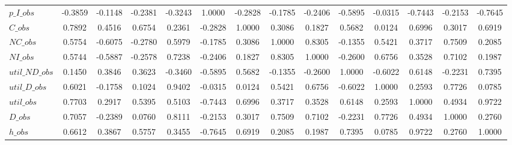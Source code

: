 \begin{center}
\begin{longtable}{lccccccccccccc}
$p\_I\_obs      $	 & 	          -0.3859	 & 	          -0.1148	 & 	          -0.2381	 & 	          -0.3243	 & 	           1.0000	 & 	          -0.2828	 & 	          -0.1785	 & 	          -0.2406	 & 	          -0.5895	 & 	          -0.0315	 & 	          -0.7443	 & 	          -0.2153	 & 	          -0.7645 \\ 
$C\_obs         $	 & 	           0.7892	 & 	           0.4516	 & 	           0.6754	 & 	           0.2361	 & 	          -0.2828	 & 	           1.0000	 & 	           0.3086	 & 	           0.1827	 & 	           0.5682	 & 	           0.0124	 & 	           0.6996	 & 	           0.3017	 & 	           0.6919 \\ 
$NC\_obs        $	 & 	           0.5754	 & 	          -0.6075	 & 	          -0.2780	 & 	           0.5979	 & 	          -0.1785	 & 	           0.3086	 & 	           1.0000	 & 	           0.8305	 & 	          -0.1355	 & 	           0.5421	 & 	           0.3717	 & 	           0.7509	 & 	           0.2085 \\ 
$NI\_obs        $	 & 	           0.5744	 & 	          -0.5887	 & 	          -0.2578	 & 	           0.7238	 & 	          -0.2406	 & 	           0.1827	 & 	           0.8305	 & 	           1.0000	 & 	          -0.2600	 & 	           0.6756	 & 	           0.3528	 & 	           0.7102	 & 	           0.1987 \\ 
$util\_ND\_obs  $	 & 	           0.1450	 & 	           0.3846	 & 	           0.3623	 & 	          -0.3460	 & 	          -0.5895	 & 	           0.5682	 & 	          -0.1355	 & 	          -0.2600	 & 	           1.0000	 & 	          -0.6022	 & 	           0.6148	 & 	          -0.2231	 & 	           0.7395 \\ 
$util\_D\_obs   $	 & 	           0.6021	 & 	          -0.1758	 & 	           0.1024	 & 	           0.9402	 & 	          -0.0315	 & 	           0.0124	 & 	           0.5421	 & 	           0.6756	 & 	          -0.6022	 & 	           1.0000	 & 	           0.2593	 & 	           0.7726	 & 	           0.0785 \\ 
$util\_obs      $	 & 	           0.7703	 & 	           0.2917	 & 	           0.5395	 & 	           0.5103	 & 	          -0.7443	 & 	           0.6996	 & 	           0.3717	 & 	           0.3528	 & 	           0.6148	 & 	           0.2593	 & 	           1.0000	 & 	           0.4934	 & 	           0.9722 \\ 
$D\_obs         $	 & 	           0.7057	 & 	          -0.2389	 & 	           0.0760	 & 	           0.8111	 & 	          -0.2153	 & 	           0.3017	 & 	           0.7509	 & 	           0.7102	 & 	          -0.2231	 & 	           0.7726	 & 	           0.4934	 & 	           1.0000	 & 	           0.2760 \\ 
$h\_obs         $	 & 	           0.6612	 & 	           0.3867	 & 	           0.5757	 & 	           0.3455	 & 	          -0.7645	 & 	           0.6919	 & 	           0.2085	 & 	           0.1987	 & 	           0.7395	 & 	           0.0785	 & 	           0.9722	 & 	           0.2760	 & 	           1.0000 \\ 
\end{longtable}
 \end{center}

